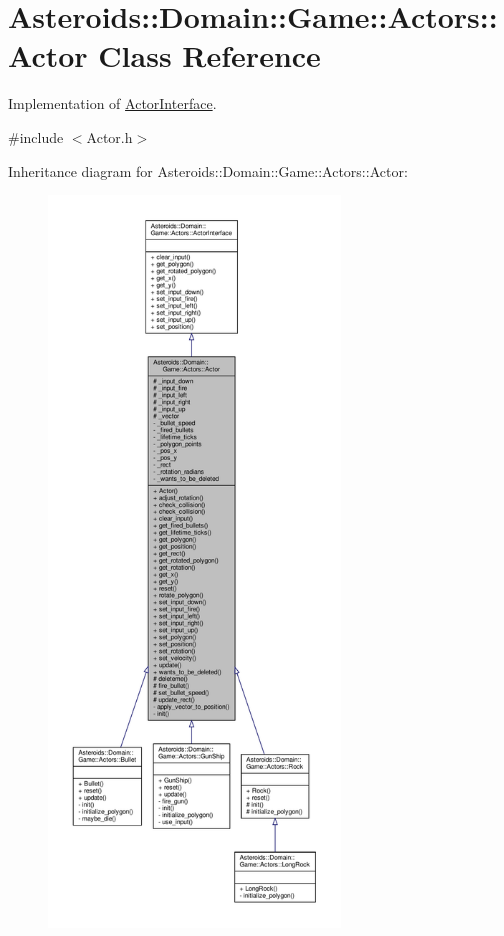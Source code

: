 \hypertarget{classAsteroids_1_1Domain_1_1Game_1_1Actors_1_1Actor}{}\section{Asteroids\+:\+:Domain\+:\+:Game\+:\+:Actors\+:\+:Actor Class Reference}
\label{classAsteroids_1_1Domain_1_1Game_1_1Actors_1_1Actor}


Implementation of \hyperlink{classAsteroids_1_1Domain_1_1Game_1_1Actors_1_1ActorInterface}{Actor\+Interface}.  




{\ttfamily \#include $<$Actor.\+h$>$}



Inheritance diagram for Asteroids\+:\+:Domain\+:\+:Game\+:\+:Actors\+:\+:Actor\+:\nopagebreak
\begin{figure}[H]
\begin{center}
\leavevmode
\includegraphics[height=550pt]{classAsteroids_1_1Domain_1_1Game_1_1Actors_1_1Actor__inherit__graph}
\end{center}
\end{figure}


